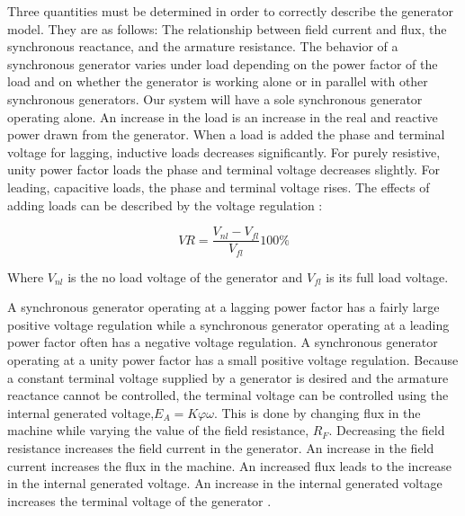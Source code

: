 Three quantities must be determined in order to correctly describe the generator model. They are as follows: The relationship between field current and flux, the synchronous reactance, and the armature resistance. The behavior of a synchronous generator varies under load depending on the power factor of the load and on whether the generator is working alone or in parallel with other synchronous generators. Our system will have a sole synchronous generator operating alone. An increase in the load is an increase in the real and reactive power drawn from the generator. When a load is added the phase and terminal voltage for lagging, inductive loads decreases significantly. For purely resistive, unity power factor loads the phase and terminal voltage decreases slightly. For leading, capacitive loads, the phase and terminal voltage rises. The effects of adding loads can be described by the voltage regulation \cite{machinery}:

\begin{equation}\label{eq:6}
VR = \frac{V_{nl}-V_{fl}}{V_{fl}} 100\%
\end{equation}

Where \begin{math}V_{nl}\end{math} is the no load voltage of the generator and \begin{math}V_{fl}\end{math} is its full load voltage.

A synchronous generator operating at a lagging power factor has a fairly large positive voltage regulation while a synchronous generator operating at a leading power factor often has a negative voltage regulation. A synchronous generator operating at a unity power factor has a small positive voltage regulation. Because a constant terminal voltage supplied by a generator is desired and the armature reactance cannot be controlled, the terminal voltage can be controlled using the internal generated voltage,\begin{math} E_A=K\varphi\omega\end{math}. This is done by changing flux in the machine while varying the value of the field resistance, \begin{math}R_F\end{math}. Decreasing the field resistance 	increases the field current in the generator. An increase in the field current increases the flux in the machine. An increased flux leads to the increase in the internal generated voltage. An increase in the internal generated voltage increases the terminal voltage of the generator \cite{machinery}.

